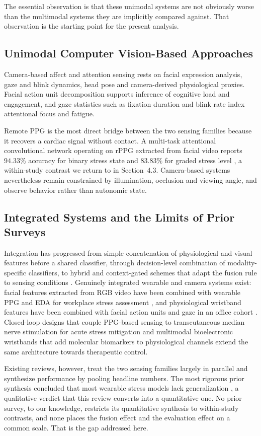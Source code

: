 \documentclass[11pt,a4paper]{article}
\begin{document}
The essential observation is that these unimodal systems are not obviously worse than the
multimodal systems they are implicitly compared against. That observation is the starting
point for the present analysis.

\subsection{Unimodal Computer Vision-Based Approaches}
Camera-based affect and attention sensing rests on facial expression analysis, gaze and blink
dynamics, head pose and camera-derived physiological proxies. Facial action unit decomposition
supports inference of cognitive load and engagement, and gaze statistics such as fixation
duration and blink rate index attentional focus and fatigue.

Remote PPG is the most direct bridge between the two sensing families because it recovers a
cardiac signal without contact. A multi-task attentional convolutional network operating on
rPPG extracted from facial video reports $94.33\%$ accuracy for binary stress state and
$83.83\%$ for graded stress level \cite{r16}, a within-study contrast we return to in
Section~4.3. Camera-based systems nevertheless remain constrained by illumination, occlusion
and viewing angle, and observe behavior rather than autonomic state.

\subsection{Integrated Systems and the Limits of Prior Surveys}
Integration has progressed from simple concatenation of physiological and visual features
before a shared classifier, through decision-level combination of modality-specific
classifiers, to hybrid and context-gated schemes that adapt the fusion rule to sensing
conditions \cite{r58,r79}. Genuinely integrated wearable and camera systems exist: facial
features extracted from RGB video have been combined with wearable PPG and EDA for workplace
stress assessment \cite{r17}, and physiological wristband features have been combined with
facial action units and gaze in an office cohort \cite{r26}. Closed-loop designs that couple
PPG-based sensing to transcutaneous median nerve stimulation for acute stress mitigation
\cite{r38} and multimodal bioelectronic wristbands that add molecular biomarkers to
physiological channels \cite{r108} extend the same architecture towards therapeutic control.

Existing reviews, however, treat the two sensing families largely in parallel and synthesize
performance by pooling headline numbers. The most rigorous prior synthesis concluded that
most wearable stress models lack generalization \cite{r118}, a qualitative verdict that this
review converts into a quantitative one. No prior survey, to our knowledge, restricts its
quantitative synthesis to within-study contrasts, and none places the fusion effect and the
evaluation effect on a common scale. That is the gap addressed here.
\end{document}
